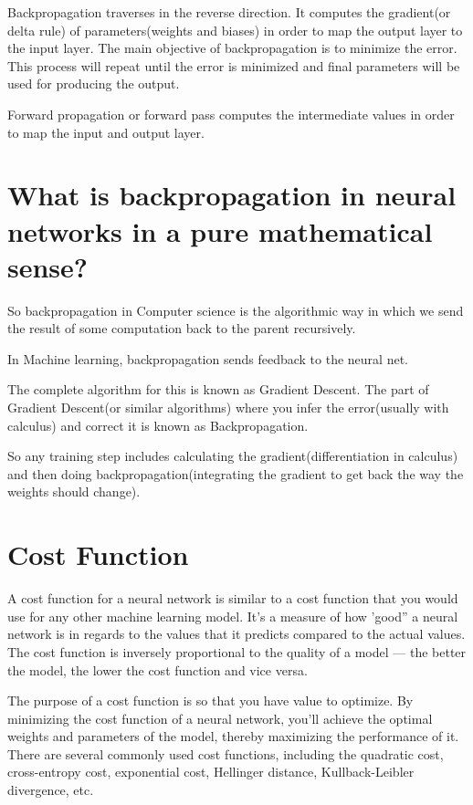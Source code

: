 \documentclass[
]{book}
\begin{document}
Backpropagation traverses in the reverse direction. It computes the gradient(or delta rule) of parameters(weights and biases) in order to map the output layer to the input layer. The main objective of backpropagation is to minimize the error. This process will repeat until the error is minimized and final parameters will be used for producing the output.

Forward propagation or forward pass computes the intermediate values in order to map the input and output layer.

\hypertarget{what-is-backpropagation-in-neural-networks-in-a-pure-mathematical-sense}{%
\section{What is backpropagation in neural networks in a pure mathematical sense?}\label{what-is-backpropagation-in-neural-networks-in-a-pure-mathematical-sense}}

So backpropagation in Computer science is the algorithmic way in which we send the result of some computation back to the parent recursively.

In Machine learning, backpropagation sends feedback to the neural net.

The complete algorithm for this is known as Gradient Descent. The part of Gradient Descent(or similar algorithms) where you infer the error(usually with calculus) and correct it is known as Backpropagation.

So any training step includes calculating the gradient(differentiation in calculus) and then doing backpropagation(integrating the gradient to get back the way the weights should change).

\hypertarget{cost-function}{%
\section{Cost Function}\label{cost-function}}

A cost function for a neural network is similar to a cost function that you would use for any other machine learning model. It's a measure of how 'good'' a neural network is in regards to the values that it predicts compared to the actual values. The cost function is inversely proportional to the quality of a model --- the better the model, the lower the cost function and vice versa.

The purpose of a cost function is so that you have value to optimize. By minimizing the cost function of a neural network, you'll achieve the optimal weights and parameters of the model, thereby maximizing the performance of it.
There are several commonly used cost functions, including the quadratic cost, cross-entropy cost, exponential cost, Hellinger distance, Kullback-Leibler divergence, etc.
\end{document}
